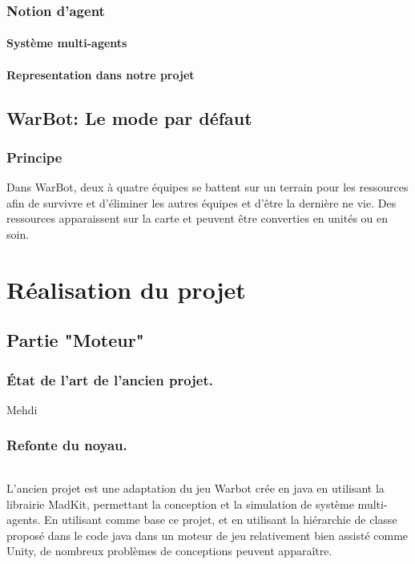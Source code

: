 \documentclass{report}
\begin{document}
\section{Notion d'agent}

\subsection{Système multi-agents}

\subsection{Representation dans notre projet}

\newpage

\chapter{WarBot: Le mode par défaut}
\section{Principe}
Dans WarBot, deux à quatre équipes se battent sur un terrain pour les ressources afin de survivre et d'éliminer les autres équipes et d’être la dernière ne vie. Des ressources apparaissent sur la carte et peuvent être converties en unités ou en soin.

\newpage
\part{Réalisation du projet}
\newpage

\chapter{Partie "Moteur"}

\section{État de l'art de l'ancien projet.} Mehdi

\section{Refonte du noyau.}
\paragraph{}L'ancien projet est une adaptation du jeu Warbot crée en java en utilisant la librairie MadKit, permettant la conception et la simulation de système multi-agents. En utilisant comme base ce projet, et en utilisant la hiérarchie de classe proposé dans le code java dans un moteur de jeu relativement bien assisté comme Unity, de nombreux problèmes de conceptions peuvent apparaître.
\end{document}
